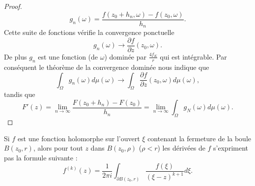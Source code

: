 \begin{proof}
\begin{equation}
        g_n(\omega)=\frac{ f(z_0+h_n,\omega)-f(z_0,\omega) }{ h_n }.
    \end{equation}
    Cette suite de fonctions vérifie la convergence ponctuelle
    \begin{equation}
        g_n(\omega)\to\frac{ \partial f }{ \partial z }(z_0,\omega).
    \end{equation}
    De plus \( g_n\) est une fonction (de \( \omega\)) dominée par \( \frac{ 4f_K }{ r }\) qui est intégrable. Par conséquent le théorème de la convergence dominée nous indique que
    \begin{equation}
        \int_{\Omega}g_n(\omega)d\mu(\omega)\to \int_{\Omega}\frac{ \partial f }{ \partial z }(z_0,\omega)d\mu(\omega),
    \end{equation}
    tandis que
    \begin{equation}
        F'(z)=\lim_{n\to \infty} \frac{ F(z_0+h_n)-F(z_0) }{ h_n }=\lim_{n\to \infty} \int_{\Omega}g_N(\omega)d\mu(\omega).
    \end{equation}
\end{proof}

\begin{corollary}       \label{CorNxTjEj}
    Si \( f\) est une fonction holomorphe sur l'ouvert \( \xi\) contenant la fermeture de la boule \( B(z_0,r)\), alors pour tout \( z\) dans \( B(z_0,\rho)\) (\( \rho<r\)) les dérivées de \( f\) s'expriment pas la formule suivante :
    \begin{equation}        \label{EQooBPIQooNhOTtB}
        f^{(k)}(z)=\frac{1}{ 2\pi i }\int_{\partial B(z_0,r)}\frac{ f(\xi) }{ (\xi-z)^{k+1} }d\xi.
    \end{equation}
\end{corollary}

